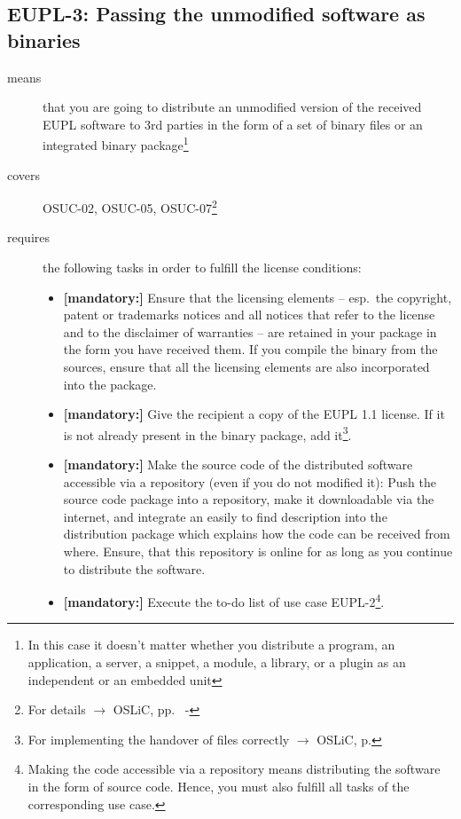 \subsection{EUPL-3: Passing the unmodified software as binaries} 

\begin{description}
\item[means] that you are going to distribute an unmodified version of the
received EUPL software to 3rd parties in the form of a set of binary files or an
integrated bi\-na\-ry package\footnote{In this case it doesn't matter
whether you  distribute a program, an application, a server, a snippet, a
module, a library, or a plugin as an independent or an embedded unit}

\item[covers] OSUC-02, OSUC-05, OSUC-07\footnote{For details $\rightarrow$ OSLiC, pp.\
\pageref{OSUC-02-DEF} - \pageref{OSUC-07-DEF}}

\item[requires] the following tasks in order to fulfill the license conditions:
\begin{itemize}
  
  \item \textbf{[mandatory:]} Ensure that the licensing elements -- esp.\ the
  copyright, patent or trademarks notices and all notices that refer to the
  license and to the disclaimer of warranties -- are retained in your package in
  the form you have received them. If you compile the binary from the sources,
  ensure that all the licensing elements are also incorporated into the package.
  
  \item \textbf{[mandatory:]} Give the recipient a copy of the EUPL 1.1
  license. If it is not already present in the binary package, add
  it\footnote{For implementing the handover of files correctly $\rightarrow$
  OSLiC, p. \pageref{DistributingFilesHint}}.

  \item \textbf{[mandatory:]} Make the source code of the distributed software
  accessible via a repository (even if you do not modified it): Push the source
  code package into a repository, make it downloadable via the internet, and
  integrate an easily to find description into the distribution package which
  explains how the code can be received from where. Ensure, that this
  repository is online for as long as you continue to distribute the software.
  
  \item \textbf{[mandatory:]} Execute the to-do list of use case EUPL-2\footnote{
  Making the code accessible via a repository means distributing the software in
  the form of source code. Hence, you must also fulfill all tasks of the
  corresponding use case.}.
 

\end{itemize}
\end{description}
